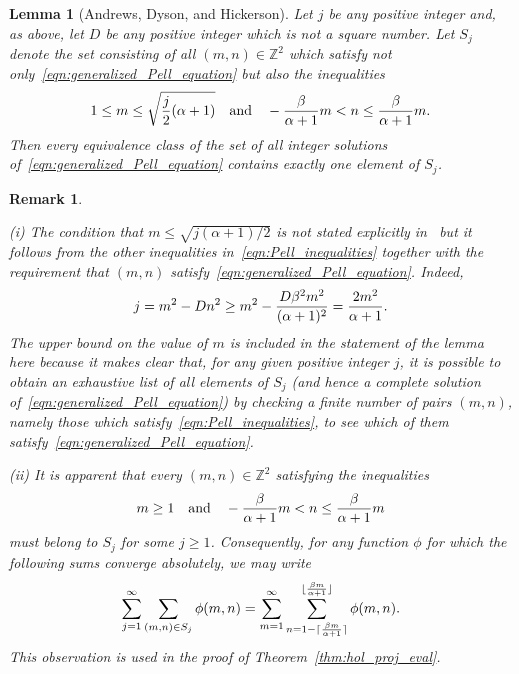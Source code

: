 \documentclass[11pt,reqno]{amsart}
\newtheorem{lemma}[theorem]{Lemma}
\renewcommand{\=}{\;=\;}
\theoremstyle{myremark}
\newtheorem{remark}{Remark}
\begin{document}
\begin{lemma}[Andrews, Dyson, and Hickerson] \label{lem:Pell}
Let $j$ be any positive integer and, as above, let $D$ be any positive integer which is not a square number. Let $S_j$ denote the set consisting of all $(m,n) \in \mathbb{Z}^2$ which satisfy not only~\eqref{eqn:generalized_Pell_equation} but also the inequalities
\begin{equation} \label{eqn:Pell_inequalities}
1 \leq m \leq \sqrt{{j \over 2}(\alpha+1)} \quad \text{and} \quad -{\beta \over \alpha+1}m < n \leq {\beta \over \alpha+1}m.
\end{equation}
Then every equivalence class of the set of all integer solutions of~\eqref{eqn:generalized_Pell_equation} contains exactly one element of $S_j$.
\end{lemma}

\begin{remark} \label{rmk:Pell}
{\normalfont
(i) The condition that $m \leq \sqrt{j(\alpha+1)/2}$ is not stated explicitly in~\cite{Andrews1988} but it follows from the other inequalities in~\eqref{eqn:Pell_inequalities} together with the requirement that $(m,n)$ satisfy~\eqref{eqn:generalized_Pell_equation}. 
Indeed,
\[ j = m^2 - Dn^2 \geq m^2 - {D\beta^2 m^2 \over (\alpha+1)^2} = {2m^2 \over \alpha + 1}. \]
The upper bound on the value of $m$ is included in the statement of the lemma here because it makes clear that, for any given positive integer $j$, it is possible to obtain an exhaustive list of all elements of $S_j$ (and hence a complete solution of~\eqref{eqn:generalized_Pell_equation}) by checking a finite number of pairs $(m,n)$, namely those which satisfy~\eqref{eqn:Pell_inequalities}, to see which of them satisfy~\eqref{eqn:generalized_Pell_equation}.

\noindent
(ii) It is apparent that every $(m,n) \in \mathbb{Z}^2$ satisfying the inequalities
\begin{equation} \label{eqn:fundamental_Pell_inequalities}
m \geq 1 \quad \text{and} \quad -{\beta \over \alpha+1}m < n \leq {\beta \over \alpha+1}m
\end{equation}
must belong to $S_j$ for some $j \geq 1$. 
Consequently, for any function $\phi$ for which the following sums converge absolutely, we may write
\[ 
\sum_{j=1}^\infty \sum_{(m,n) \in S_j} \phi(m,n) = \sum_{m=1}^\infty \sum_{n=1-\lceil {\beta m \over \alpha+1} \rceil}^{\lfloor {\beta m \over \alpha+1} \rfloor} \phi(m,n). 
\]
This observation is used in the proof of Theorem~\ref{thm:hol_proj_eval}.}
\end{remark}
\end{document}
